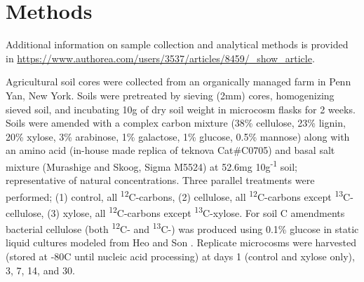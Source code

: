 \section{Methods}
Additional information on sample collection and analytical methods is provided in \href{SI Materials and Methods}{https://www.authorea.com/users/3537/articles/8459/_show_article}.


Agricultural soil cores were collected from an organically managed farm in Penn Yan, New York. Soils were pretreated by sieving (2mm) cores, homogenizing sieved soil, and incubating 10g of dry soil weight in microcosm flasks for 2 weeks.  Soils were amended with a complex carbon mixture (38\% cellulose, 23\% lignin, 20\% xylose, 3\% arabinose, 1\% galactose, 1\% glucose, 0.5\% mannose) along with an amino acid (in-house made replica of teknova Cat#C0705) and basal salt mixture (Murashige and Skoog, Sigma M5524) at 52.6mg 10g\textsuperscript{-1} soil; representative of natural concentrations. Three parallel treatments were performed; (1) control, all \textsuperscript{12}C-carbons, (2) cellulose, all \textsuperscript{12}C-carbons except \textsuperscript{13}C-cellulose, (3) xylose, all \textsuperscript{12}C-carbons except \textsuperscript{13}C-xylose. For soil C amendments bacterial cellulose (both \textsuperscript{12}C- and \textsuperscript{13}C-) was produced using 0.1\% glucose in static liquid cultures modeled from Heo and Son \cite{Heo_Son_2002}. Replicate microcosms were harvested (stored at -80{\textdegree}C until nucleic acid processing) at days 1 (control and xylose only), 3, 7, 14, and 30.



